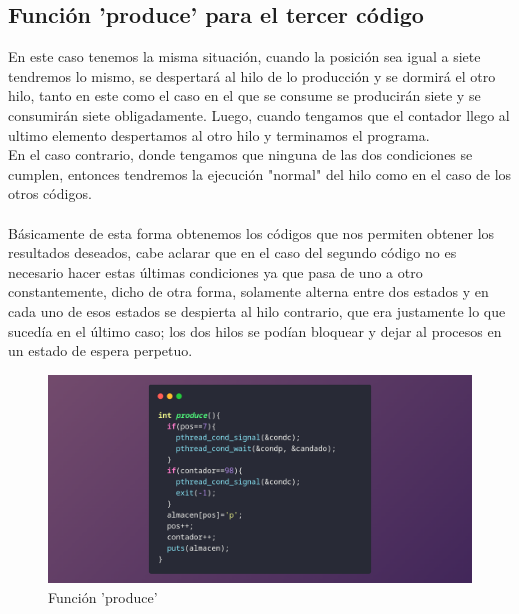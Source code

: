 \documentclass[10pt]{article}
\begin{document}
	\subsection{Función 'produce' para el tercer código}
	En este caso tenemos la misma situación, cuando la posición sea igual a siete tendremos lo mismo, se despertará al hilo de lo producción y se dormirá el otro hilo, tanto en este como el caso en el que se consume se producirán siete y se consumirán siete obligadamente. Luego, cuando tengamos que el contador llego al ultimo elemento despertamos al otro hilo y terminamos el programa. 
	\\
	En el caso contrario, donde tengamos que ninguna de las dos condiciones se cumplen, entonces tendremos la ejecución "normal" del hilo como en el caso de los otros códigos. 
	\\\\
	Básicamente de esta forma obtenemos los códigos que nos permiten obtener los resultados deseados, cabe aclarar que en el caso del segundo código no es necesario hacer estas últimas condiciones ya que pasa de uno a otro constantemente, dicho de otra forma, solamente alterna entre dos estados y en cada uno de esos estados se despierta al hilo contrario, que era justamente lo que sucedía en el último caso; los dos hilos se podían bloquear y dejar al procesos en un estado de espera perpetuo. 
	\begin{figure}[h!]
	\centering
	\includegraphics[width=\linewidth]{producev2.png}
	\caption{Función 'produce'}
	\label{fig:producev2}
	\end{figure}
	\newpage
\end{document}
